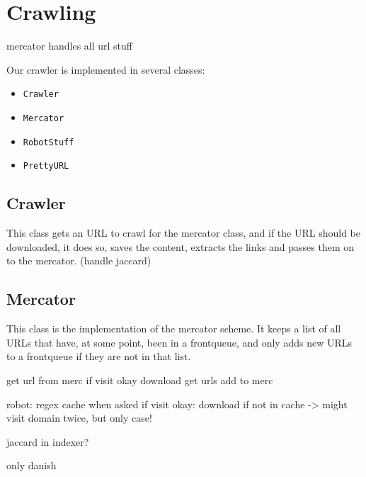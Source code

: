 \section{Crawling}
mercator handles all url stuff

Our crawler is implemented in several classes:
\begin{itemize}
	\item \texttt{Crawler}
	\item \texttt{Mercator}
	\item \texttt{RobotStuff}
	\item \texttt{PrettyURL}
\end{itemize}

\subsection{Crawler}
This class gets an URL to crawl for the mercator class, and if the URL should be downloaded, it does so, saves the content, extracts the links and passes them on to the mercator. (handle jaccard)

\subsection{Mercator}
This class is the implementation of the mercator scheme. It keeps a list of all URLs that have, at some point, been in a frontqueue, and only adds new URLs to a frontqueue if they are not in that list.


get url from merc
if visit okay
	download
	get urls
		add to merc
		
		
robot:
	regex
	cache
	when asked if visit okay:
		download if not in cache -> might visit domain twice, but only case!


jaccard in indexer?

only danish